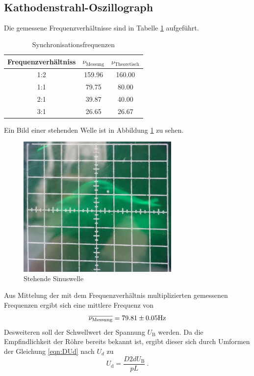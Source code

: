 \subsection{Kathodenstrahl-Oszillograph}
Die gemessene Frequenzverhältnisse sind in Tabelle \ref{tab:sync} aufgeführt.
\begin{table}
  \centering
  \begin{tabular}{c c c}
    \toprule
    Frequenzverhältniss & $\nu_\text{Messung}$ & $\nu_\text{Theoretisch}$ \\
    \midrule
    1:2	& 159.96& 160.00\\
    1:1	& 79.75 & 80.00	\\
    2:1	& 39.87 & 40.00	\\
    3:1	& 26.65 & 26.67	\\
    \bottomrule
  \end{tabular}
  \caption{Synchronisationsfrequenzen}
  \label{tab:sync}
\end{table}
Ein Bild einer stehenden Welle ist in Abbildung \ref{fig:pic} zu sehen.
\begin{figure}
  \centering
  \includegraphics[height=7cm]{picture/sinus.png}
  \caption{Stehende Sinuswelle}
  \label{fig:pic}
\end{figure}
Aus Mittelung der mit dem Frequenzverhältnis multiplizierten gemessenen Frequenzen ergibt sich eine mittlere Frequenz von
\begin{equation}
  \overline{\nu_\text{Messung}} = \num{79.81 +- 0.05} \text{Hz}
  \label{eqn:numess}
\end{equation}
Desweiteren soll der Schwellwert der Spannung $U_\text{B}$ werden. Da die Empfindlichkeit der Röhre bereits bekannt ist, ergibt dieser sich durch Umformen der Gleichung \eqref{eqn:DUd} nach $U_d$ zu
\begin{equation}
  U_\text{d} = \frac{D 2 d U_\text{B}}{p L} \ .
  \label{eqn:dfs}
\end{equation}
